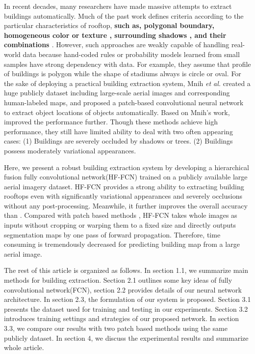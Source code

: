 \documentclass[runningheads]{llncs}
\begin{document}
   In recent decades, many researchers have made massive attempts to extract buildings automatically. Much of the past work defines criteria according to the particular   characteristics of rooftop, \textbf{such as, polygonal boundary\cite{noronha2001detection}\cite{nosrati2009novel}\cite{izadi2012three}\cite{wang2015efficient}, homogeneous color or texture \cite{cote2013automatic}, surrounding shadows \cite{B2008Building}\cite{ok2013automated}\cite{chen2014shadow}\cite{ngoautomatic}, and their combinations \cite{baluyan2013novel}\cite{li2015robust}}. However, such approaches are weakly capable of handling real-world data because hand-coded rules or probability models learned from small samples have strong dependency with data. For example, they assume that profile of buildings is polygon while the shape of stadiums always is circle or oval. For the sake of deploying a practical building extraction system, Mnih \textit{et al.} \cite{Mnih2013Machine} created a huge publicly dataset including large-scale aerial images and corresponding human-labeled maps, and proposed a patch-based convolutional neural network to extract object locations of objects automatically. Based on Mnih's work, \cite{Saito2016Multiple} improved the performance further. Though these methods achieve high performance, they still have limited ability to deal with two often appearing cases: (1) Buildings are severely occluded by shadows or trees. (2) Buildings possess moderately variational appearances. 
      
   Here, we present a robust building extraction system by developing a hierarchical fusion fully convolutional network(HF-FCN) trained on a publicly available large aerial imagery dataset\cite{Mnih2013Machine}. HF-FCN provides a strong ability to extracting building rooftops even with significantly variational appearances and severely occlusions without any post-processing. Meanwhile, it further improves the overall accuracy than \cite{Mnih2013Machine}\cite{Saito2016Multiple}. Compared with patch based methods \cite{Mnih2013Machine}\cite{Saito2016Multiple}, HF-FCN takes whole images as inputs without cropping or warping them to a fixed size and directly outputs segmentation maps by one pass of forward propagation. Therefore, time consuming is tremendously decreased for predicting building map from a large aerial image.  
  
   The rest of this article is organized as follows. In section 1.1, we summarize main   methods for building extraction. Section 2.1 outlines some key ideas of fully convolutional network(FCN), section 2.2 provides details of our neural network architecture. In section 2.3, the formulation of our system is proposed. Section 3.1 presents the dataset used for training and testing in our experiments. Section 3.2  introduces training settings and strategies of our proposed network.  In section 3.3, we compare our results with two patch based methods using the same publicly dataset. In section 4, we discuss the experimental results and summarize whole article. 
   
\end{document}
